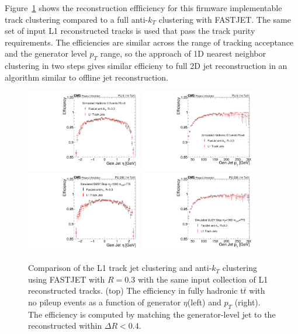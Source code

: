 Figure~\ref{fig:TkJetEfficiency} shows the reconstruction effficiency for this firmware implementable track clustering compared to a full anti-$k_{T}$ clustering with FASTJET. The same set of input L1 reconstructed tracks is used that pass the track purity requirements. The efficiencies are similar across the range of tracking acceptance and the generator level $p_{T}$ range, so the approach of 1D nearest neighbor clustering in two steps gives similar efficieny to full 2D jet reconstruction in an algorithm similar to offline jet reconstruction. 


 

\begin{figure}[htbp!]
\includegraphics[width=0.45\textwidth ]{NoPUTTBarEff.pdf}
\includegraphics[width=0.45\textwidth]{NoPUTTBarPtEff.pdf}\\
\includegraphics[width=0.45\textwidth]{StopSamplePUEtaEff.pdf}
\includegraphics[width=0.45\textwidth]{StopSamplePUPtEff.pdf}
\caption{Comparison of the L1 track jet clustering and anti-$k_{T}$ clustering using FASTJET with $R=0.3$ with the same input collection of L1 reconstructed tracks. (top) The efficiency in fully hadronic t$\overline{t}$ with no pileup events as a function of generator $\eta$(left) and $p_{T}$ (right). The efficiency is computed by matching the generator-level jet to the reconstructed within $\Delta R<0.4$. }
\label{fig:TkJetEfficiency}
\end{figure}


